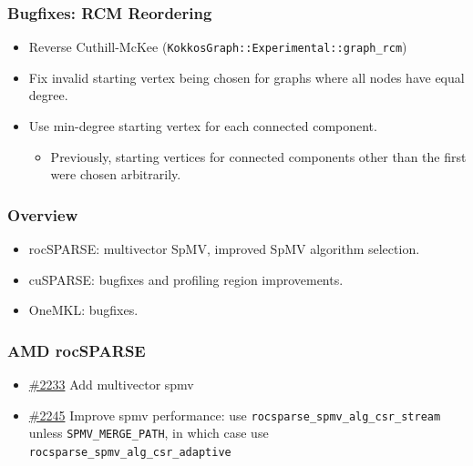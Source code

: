 \begin{frame}[fragile]
\frametitle{Bugfixes: RCM Reordering}

  \vspace{10pt}

  \begin{itemize}
    \item Reverse Cuthill-McKee (\texttt{KokkosGraph::Experimental::graph\_rcm})
    \item Fix invalid starting vertex being chosen for graphs where all nodes have equal degree.
    \item Use min-degree starting vertex for each connected component.
    \begin{itemize}
      \item Previously, starting vertices for connected components other than the first were chosen arbitrarily.
    \end{itemize}
  \end{itemize}

  \vspace{10pt}

\end{frame}

\begin{frame}
\frametitle{Overview}
\begin{itemize}
\item rocSPARSE: multivector SpMV, improved SpMV algorithm selection.
\item cuSPARSE: bugfixes and profiling region improvements.
\item OneMKL: bugfixes.
\end{itemize}
\end{frame}

\begin{frame}
\frametitle{AMD rocSPARSE}
\begin{itemize}
\item \href{https://github.com/kokkos/kokkos-kernels/pull/2233}{\#2233}
Add multivector spmv
\item \href{https://github.com/kokkos/kokkos-kernels/pull/2245}{\#2245}
Improve spmv performance: use \texttt{rocsparse\_spmv\_alg\_csr\_stream} unless \texttt{SPMV\_MERGE\_PATH}, in which case use \texttt{rocsparse\_spmv\_alg\_csr\_adaptive}
\end{itemize}
\end{frame}


